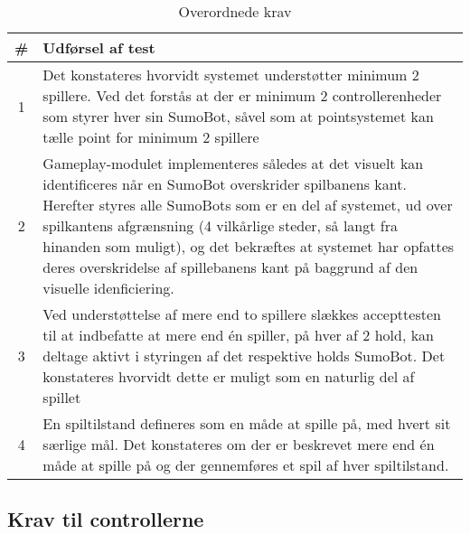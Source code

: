 \begin{table}[]
\centering
\caption{Overordnede krav}\label{tab:Overordnede krav}
\begin{tabular}{c p{7cm}}
\# & \textbf{Udførsel af test} \\ \toprule
1 & Det konstateres hvorvidt systemet understøtter minimum 2 spillere. Ved det forstås at der er minimum 2 controllerenheder som styrer hver sin SumoBot, såvel som at pointsystemet kan tælle point for minimum 2 spillere \\\midrule
2 & Gameplay-modulet implementeres således at det visuelt kan identificeres når en SumoBot overskrider spilbanens kant. Herefter styres alle SumoBots som er en del af systemet, ud over spilkantens afgrænsning (4 vilkårlige steder, så langt fra hinanden som muligt), og det bekræftes at systemet har opfattes deres overskridelse af spillebanens kant på baggrund af den visuelle idenficiering. \\\midrule
3 & Ved understøttelse af mere end to spillere slækkes accepttesten til at indbefatte at mere end én spiller, på hver af 2 hold, kan deltage aktivt i styringen af det respektive holds SumoBot. Det konstateres hvorvidt dette er muligt som en naturlig del af spillet\\\midrule
4 & En spiltilstand defineres som en måde at spille på, med hvert sit særlige mål. Det konstateres om der er beskrevet mere end én måde at spille på og der gennemføres et spil af hver spiltilstand. \\\bottomrule
\end{tabular}
\end{table}

\subsection{Krav til controllerne}

